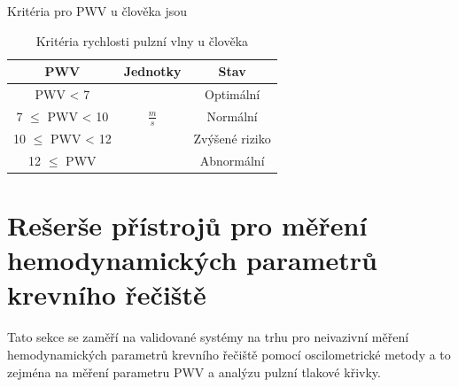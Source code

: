 Kritéria pro PWV u člověka jsou
\begin{table}[H]
    \label{tab:pwv_criteria}
    \caption{Kritéria rychlosti pulzní vlny u člověka \cite{cite:Fabian}}
    \begin{ctucolortab}
        \begin{tabular}{ccc}
            \toprule
            PWV                & Jednotky      & Stav           \\ \midrule
            PWV < 7            &               & Optimální      \\
            7 $\leq$ PWV < 10  & $\frac{m}{s}$ & Normální       \\
            10 $\leq$ PWV < 12 &               & Zvýšené riziko \\
            12  $\leq$ PWV     &               & Abnormální     \\

            \bottomrule
        \end{tabular}
    \end{ctucolortab}
\end{table}
\section{Rešerše přístrojů pro měření hemodynamických parametrů krevního řečiště}
Tato sekce se zaměří na validované systémy na trhu pro neivazivní měření hemodynamických parametrů krevního řečiště pomocí oscilometrické metody a to zejména na měření parametru PWV a analýzu pulzní tlakové křivky.


